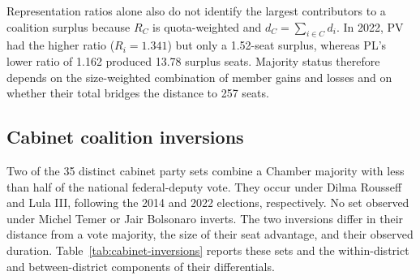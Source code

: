 \documentclass[11pt]{article}
\begin{document}
Representation ratios alone also do not identify the largest contributors to a
coalition surplus because $R_C$ is quota-weighted and $d_C=\sum_{i\in C}d_i$.
In 2022, PV had the higher ratio ($R_i=1.341$) but only a 1.52-seat surplus,
whereas PL's lower ratio of 1.162 produced 13.78 surplus seats. Majority status
therefore depends on the size-weighted combination of member gains and losses
and on whether their total bridges the distance to 257 seats.


\subsection{Cabinet coalition inversions}
\label{sec:cabinets}

Two of the 35 distinct cabinet party sets combine a Chamber majority with less
than half of the national federal-deputy vote. They occur under Dilma Rousseff
and Lula III, following the 2014 and 2022 elections, respectively. No set
observed under Michel Temer or Jair Bolsonaro inverts. The two inversions differ
in their distance from a vote majority, the size of their seat advantage, and
their observed duration. Table~\ref{tab:cabinet-inversions} reports these sets and the within-district
and between-district components of their differentials.

\end{document}
